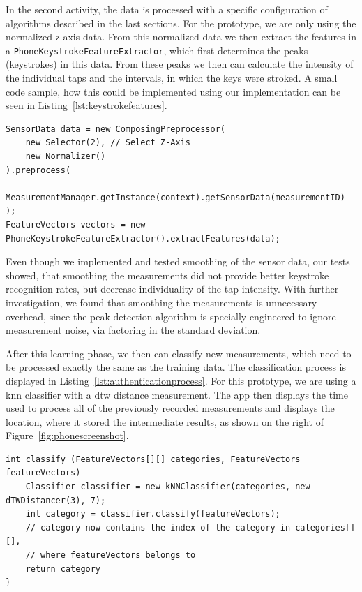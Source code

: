 In the second \gls{activity}, the data is processed with a specific configuration of algorithms described in the last sections. For the prototype, we are only using the normalized z-axis data. From this normalized data we then extract the features in a \lstinline$PhoneKeystrokeFeatureExtractor$, which first determines the peaks (\ie keystrokes) in this data. From these peaks we then can calculate the intensity of the individual taps and the intervals, in which the keys were stroked. A small code sample, how this could be implemented using our implementation can be seen in Listing~\ref{lst:keystrokefeatures}.

\begin{lstlisting}[float,
caption={Minimum working example to extract keystroke features},
label={lst:keystrokefeatures}]
SensorData data = new ComposingPreprocessor(
    new Selector(2), // Select Z-Axis
    new Normalizer()
).preprocess(
    MeasurementManager.getInstance(context).getSensorData(measurementID)
);
FeatureVectors vectors = new PhoneKeystrokeFeatureExtractor().extractFeatures(data);
\end{lstlisting}

Even though we implemented and tested smoothing of the sensor data, our tests showed, that smoothing the measurements did not provide better keystroke recognition rates, but decrease individuality of the tap intensity. With further investigation, we found that smoothing the measurements is unnecessary overhead, since the peak detection algorithm is specially engineered to ignore measurement noise, via factoring in the standard deviation.

After this learning phase, we then can classify new measurements, which need to be processed exactly the same as the training data. The classification process is displayed in Listing~\ref{lst:authenticationprocess}. For this prototype, we are using a \gls{knn} classifier with a \gls{dtw} distance measurement. The \gls{app} then displays the time used to process all of the previously recorded measurements and displays the location, where it stored the intermediate results, as shown on the right of Figure~\ref{fig:phonescreenshot}.

\begin{lstlisting}[float,
caption={Minimum working example to classify given \lstinline$FeatureVectors$ according to previously learened \lstinline$categories$},
label={lst:authenticationprocess}]
int classify (FeatureVectors[][] categories, FeatureVectors featureVectors)
    Classifier classifier = new kNNClassifier(categories, new dTWDistancer(3), 7);
    int category = classifier.classify(featureVectors);
    // category now contains the index of the category in categories[][], 
    // where featureVectors belongs to
    return category
}
\end{lstlisting}

